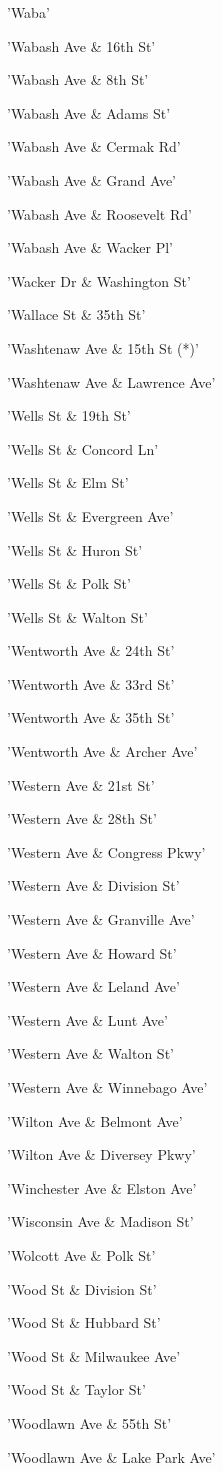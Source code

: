 \documentclass[11pt]{article}
\begin{document}
\begin{enumerate*}
\item 'Waba'
\item 'Wabash Ave \& 16th St'
\item 'Wabash Ave \& 8th St'
\item 'Wabash Ave \& Adams St'
\item 'Wabash Ave \& Cermak Rd'
\item 'Wabash Ave \& Grand Ave'
\item 'Wabash Ave \& Roosevelt Rd'
\item 'Wabash Ave \& Wacker Pl'
\item 'Wacker Dr \& Washington St'
\item 'Wallace St \& 35th St'
\item 'Washtenaw Ave \& 15th St (*)'
\item 'Washtenaw Ave \& Lawrence Ave'
\item 'Wells St \& 19th St'
\item 'Wells St \& Concord Ln'
\item 'Wells St \& Elm St'
\item 'Wells St \& Evergreen Ave'
\item 'Wells St \& Huron St'
\item 'Wells St \& Polk St'
\item 'Wells St \& Walton St'
\item 'Wentworth Ave \& 24th St'
\item 'Wentworth Ave \& 33rd St'
\item 'Wentworth Ave \& 35th St'
\item 'Wentworth Ave \& Archer Ave'
\item 'Western Ave \& 21st St'
\item 'Western Ave \& 28th St'
\item 'Western Ave \& Congress Pkwy'
\item 'Western Ave \& Division St'
\item 'Western Ave \& Granville Ave'
\item 'Western Ave \& Howard St'
\item 'Western Ave \& Leland Ave'
\item 'Western Ave \& Lunt Ave'
\item 'Western Ave \& Walton St'
\item 'Western Ave \& Winnebago Ave'
\item 'Wilton Ave \& Belmont Ave'
\item 'Wilton Ave \& Diversey Pkwy'
\item 'Winchester Ave \& Elston Ave'
\item 'Wisconsin Ave \& Madison St'
\item 'Wolcott Ave \& Polk St'
\item 'Wood St \& Division St'
\item 'Wood St \& Hubbard St'
\item 'Wood St \& Milwaukee Ave'
\item 'Wood St \& Taylor St'
\item 'Woodlawn Ave \& 55th St'
\item 'Woodlawn Ave \& Lake Park Ave'
\end{enumerate*}
\end{document}
